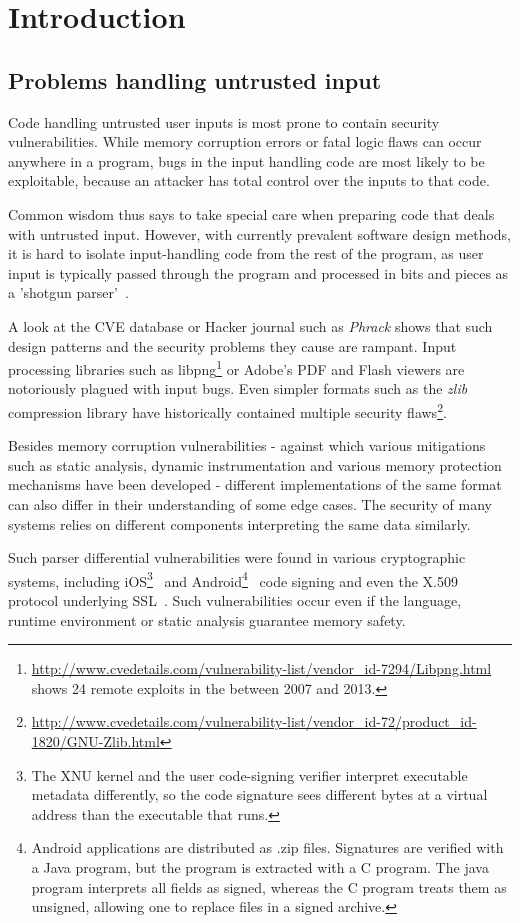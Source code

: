 \section{Introduction}

\subsection{Problems handling untrusted input}

Code handling untrusted user inputs is most prone to contain security
vulnerabilities. While memory corruption errors or fatal logic flaws
can occur anywhere in a program, bugs in the input handling code are
most likely to be exploitable, because an attacker has total control
over the inputs to that code.

Common wisdom thus says to take special care when preparing code that
deals with untrusted input.  However, with currently prevalent software
design methods, it is hard to isolate input-handling code from the rest
of the program, as user input is typically passed through the program and
processed in bits and pieces as a 'shotgun parser'~\cite{shotgun-parser}.

A look at the CVE database or Hacker journal such as
\textit{Phrack} shows that such design patterns and the security
problems they cause are rampant. Input processing libraries such as
libpng\footnote{\url{http://www.cvedetails.com/vulnerability-list/vendor_id-7294/Libpng.html}
shows 24 remote exploits in the between 2007 and 2013.} or
Adobe's PDF and Flash viewers are notoriously plagued with
input bugs. Even simpler formats such as the \textit{zlib}
compression library have historically contained multiple security
flaws\footnote{\url{http://www.cvedetails.com/vulnerability-list/vendor_id-72/product_id-1820/GNU-Zlib.html}}.

Besides memory corruption vulnerabilities - against which various
mitigations such as static analysis, dynamic instrumentation and
various memory protection mechanisms have been developed - different
implementations of the same format can also differ in their understanding
of some edge cases. The security of many systems relies on different
components interpreting the same data similarly.

Such parser differential vulnerabilities were found in various
cryptographic systems, including  iOS\footnote{The XNU kernel and the
user code-signing verifier interpret executable metadata differently,
so the code signature sees different bytes at a virtual address than
the executable that runs.}~\cite{evaders6} and Android\footnote{Android
applications are distributed as .zip files. Signatures are verified
with a Java program, but the program is extracted with a C program.
The java program interprets all fields as signed, whereas the C
program treats them as unsigned, allowing one to replace files in a
signed archive.}~\cite{saurik-masterkey} code signing and even the
X.509 protocol underlying SSL~\cite{DBLP:conf/fc/KaminskyPS10}. Such
vulnerabilities occur even if the language, runtime environment or static
analysis guarantee memory safety.

